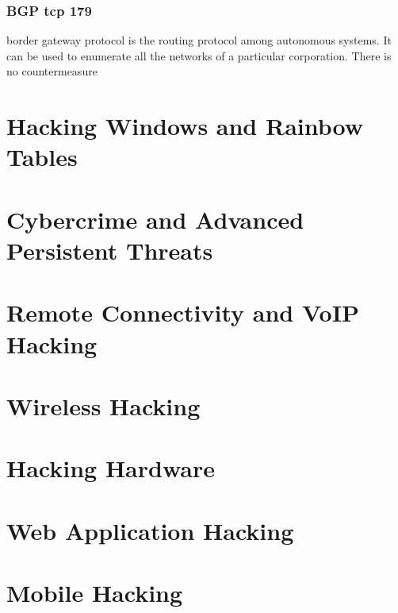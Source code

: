 \subsection{BGP tcp 179}
border gateway protocol is the routing protocol among autonomous systems. It can be used to enumerate all the networks of a particular corporation. There is no countermeasure

\chapter{Hacking Windows and Rainbow Tables}
\section{}

\chapter{Cybercrime and Advanced Persistent Threats}
\section{}

\chapter{Remote Connectivity and VoIP Hacking}
\section{}

\chapter{Wireless Hacking}
\section{}

\chapter{Hacking Hardware}
\section{}

\chapter{Web Application Hacking}
\section{}

\chapter{Mobile Hacking}
\section{}